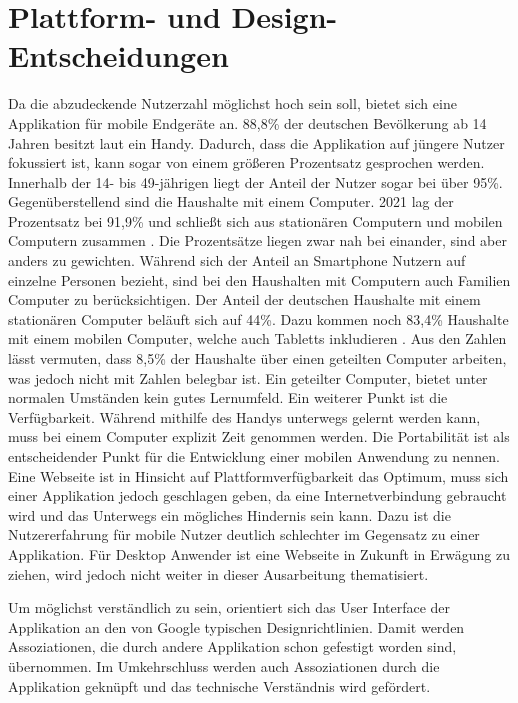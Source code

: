 \section{Plattform- und Design-Entscheidungen}
\label{section:design}
Da die abzudeckende Nutzerzahl möglichst hoch sein soll, bietet sich eine Applikation für mobile Endgeräte an. 88,8\% der deutschen Bevölkerung ab 14 Jahren besitzt laut \cite{Statista:Smartphonenutzung} ein Handy. Dadurch, dass die Applikation auf jüngere Nutzer fokussiert ist, kann sogar von einem größeren Prozentsatz gesprochen werden. Innerhalb der 14- bis 49-jährigen liegt der Anteil der Nutzer sogar bei über 95\%. Gegenüberstellend sind die Haushalte mit einem Computer. 2021 lag der Prozentsatz bei 91,9\% und schließt sich aus stationären Computern und mobilen Computern zusammen \cite{Statista:Computernutzung}. Die Prozentsätze liegen zwar nah bei einander, sind aber anders zu gewichten. Während sich der Anteil an Smartphone Nutzern auf einzelne Personen bezieht, sind bei den Haushalten mit Computern auch Familien Computer zu berücksichtigen. Der Anteil der deutschen Haushalte mit einem stationären Computer beläuft sich auf 44\%. Dazu kommen noch 83,4\% Haushalte mit einem mobilen Computer, welche auch Tabletts inkludieren \cite{Statista:Computernutzung}. Aus den Zahlen lässt vermuten, dass 8,5\% der Haushalte über einen geteilten Computer arbeiten, was jedoch nicht mit Zahlen belegbar ist. Ein geteilter Computer, bietet unter normalen Umständen kein gutes Lernumfeld. Ein weiterer Punkt ist die Verfügbarkeit. Während mithilfe des Handys unterwegs gelernt werden kann, muss bei einem Computer explizit Zeit genommen werden. Die Portabilität ist als entscheidender Punkt für die Entwicklung einer mobilen Anwendung zu nennen. Eine Webseite ist in Hinsicht auf Plattformverfügbarkeit das Optimum, muss sich einer Applikation jedoch geschlagen geben, da eine Internetverbindung gebraucht wird und das Unterwegs ein mögliches Hindernis sein kann. Dazu ist die Nutzererfahrung für mobile Nutzer deutlich schlechter im Gegensatz zu einer Applikation. Für Desktop Anwender ist eine Webseite in Zukunft in Erwägung zu ziehen, wird jedoch nicht weiter in dieser Ausarbeitung thematisiert.

Um möglichst verständlich zu sein, orientiert sich das User Interface der Applikation an den von Google typischen Designrichtlinien. Damit werden Assoziationen, die durch andere Applikation schon gefestigt worden sind, übernommen. Im Umkehrschluss werden auch Assoziationen durch die Applikation geknüpft und das technische Verständnis wird gefördert.

